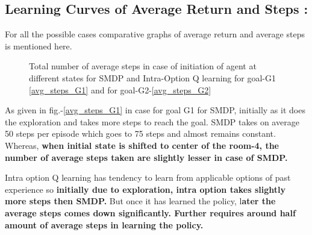 \documentclass[preprint,12pt]{elsarticle}
\begin{document}
 \subsection{Learning Curves of Average Return and Steps :}
  For all the possible cases comparative graphs of average return and average steps is mentioned here. 
 
 \begin{figure}[H]
 	\centering  
 	\caption{Total number of average steps in case of initiation of agent at different states for SMDP and Intra-Option Q learning for goal-G1 \ref{avg_steps_G1} and for goal-G2-\ref{avg_steps_G2}}
 	\label{fig:Avg_stes}
 \end{figure}
 
 As given in fig.-\ref{avg_steps_G1} in case for goal G1 for SMDP, initially as it does the exploration and takes more steps to reach the goal. SMDP takes on average 50 steps per episode which goes to 75 steps and almost remains constant. Whereas,\textbf{ when initial state is shifted to center of the room-4, the number of average steps taken are slightly lesser in case of SMDP.}
 
 Intra option Q learning has tendency to learn from applicable options of past experience so \textbf{initially due to exploration, intra option takes slightly more steps then SMDP.}  But once it has learned the policy, l\textbf{ater the average steps comes down significantly.  Further requires around half amount of average steps in learning the policy. } 
 
\end{document}
